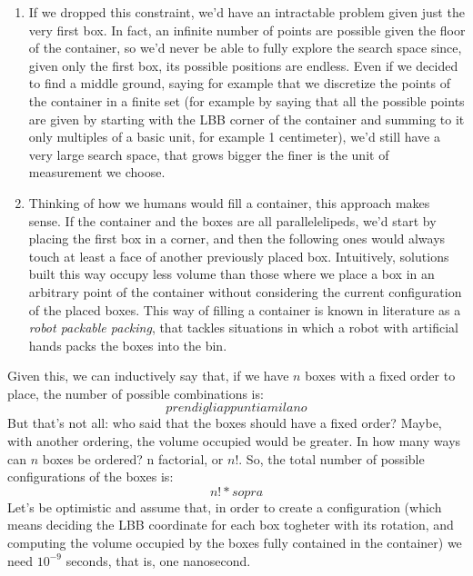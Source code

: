 \documentclass[12pt]{extarticle}
\begin{document}
\begin{enumerate}
    \item If we dropped this constraint, we'd have an intractable problem given just the very first box. In fact, an infinite number of points are possible given the floor of the container, so we'd never be able to fully explore the search space since, given only the first box, its possible positions are endless. Even if we decided to find a middle ground, saying for example that we discretize the points of the container in a finite set (for example by saying that all the possible points are given by starting with the LBB corner of the container and summing to it only multiples of a basic unit, for example 1 centimeter), we'd still have a very large search space, that grows bigger the finer is the unit of measurement we choose.
    \item Thinking of how we humans would fill a container, this approach makes sense. If the container and the boxes are all parallelelipeds, we'd start by placing the first box in a corner, and then the following ones would always touch at least a face of another previously placed box. Intuitively, solutions built this way occupy less volume than those where we place a box in an arbitrary point of the container without considering the current configuration of the placed boxes. This way of filling a container is known in literature as a \emph{robot packable packing}, that tackles situations in which a robot with artificial hands packs the boxes into the bin\cite{hanan:2013}. 
\end{enumerate}
Given this, we can inductively say that, if we have $n$ boxes with a fixed order to place, the number of possible combinations is:
\begin{equation*}
    prendi gli appunti a milano
\end{equation*}
But that's not all: who said that the boxes should have a fixed order? Maybe, with another ordering, the volume occupied would be greater. In how many ways can $n$ boxes be ordered? n factorial, or $n!$. So, the total number of possible configurations of the boxes is:
\begin{equation*}
    n! * sopra
\end{equation*}
Let's be optimistic and assume that, in order to create a configuration (which means deciding the LBB coordinate for each box togheter with its rotation, and computing the volume occupied by the boxes fully contained in the container) we need $10^{-9}$ seconds, that is, one nanosecond. 



\end{document}
